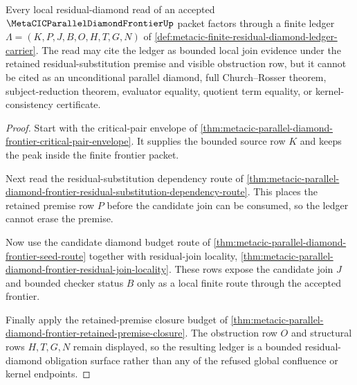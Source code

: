 \begin{theorem}
\label{thm:metacic-finite-residual-diamond-ledger-local-join-obligations}
Every local residual-diamond read of an accepted $\MetaCICParallelDiamondFrontierUp$ packet factors through a finite ledger $\Lambda=(K,P,J,B,O,H,T,G,N)$ of \autoref{def:metacic-finite-residual-diamond-ledger-carrier}. The read may cite the ledger as bounded local join evidence under the retained residual-substitution premise and visible obstruction row, but it cannot be cited as an unconditional parallel diamond, full Church--Rosser theorem, subject-reduction theorem, evaluator equality, quotient term equality, or kernel-consistency certificate.
\end{theorem}
\begin{proof}
Start with the critical-pair envelope of \autoref{thm:metacic-parallel-diamond-frontier-critical-pair-envelope}. It supplies the bounded source row $K$ and keeps the peak inside the finite frontier packet.

Next read the residual-substitution dependency route of \autoref{thm:metacic-parallel-diamond-frontier-residual-substitution-dependency-route}. This places the retained premise row $P$ before the candidate join can be consumed, so the ledger cannot erase the premise.

Now use the candidate diamond budget route of \autoref{thm:metacic-parallel-diamond-frontier-seed-route} together with residual-join locality, \autoref{thm:metacic-parallel-diamond-frontier-residual-join-locality}. These rows expose the candidate join $J$ and bounded checker status $B$ only as a local finite route through the accepted frontier.

Finally apply the retained-premise closure budget of \autoref{thm:metacic-parallel-diamond-frontier-retained-premise-closure}. The obstruction row $O$ and structural rows $H,T,G,N$ remain displayed, so the resulting ledger is a bounded residual-diamond obligation surface rather than any of the refused global confluence or kernel endpoints.
\end{proof}
